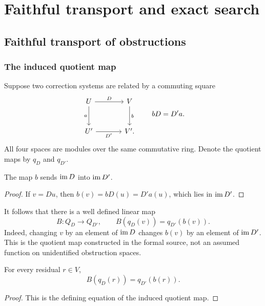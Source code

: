 \chapter{Faithful transport and exact search}\label{CR:book:chapter-56}
\section{Faithful transport of obstructions}\label{CR:cr-source-section-4}\label{CR:ch:transport}
\subsection{The induced quotient map}
Suppose two correction systems are related by a commuting square
\begin{equation}\label{CR:eq:square}
\begin{tikzcd}[column sep=large,row sep=large]
U \arrow[r,"D"] \arrow[d,"a"'] & V \arrow[d,"b"]\\
U' \arrow[r,"D'"'] & V'.
\end{tikzcd}
\qquad bD=D'a.
\end{equation}
All four spaces are modules over the same commutative ring. Denote the quotient maps by $q_D$ and $q_{D'}$.

\begin{CRlemma}\label{CR:lem:range-maps}
The map $b$ sends $\operatorname{im} D$ into $\operatorname{im} D'$.
\end{CRlemma}
\begin{proof}
If $v=Du$, then $b(v)=bD(u)=D'a(u)$, which lies in $\operatorname{im} D'$.
\end{proof}

It follows that there is a well defined linear map
\[
B:Q_D\longrightarrow Q_{D'},\qquad B(q_D(v))=q_{D'}(b(v)).
\]
Indeed, changing $v$ by an element of $\operatorname{im} D$ changes $b(v)$ by an element of $\operatorname{im} D'$. This is the quotient map constructed in the formal source, not an assumed function on unidentified obstruction spaces.

\begin{CRproposition}[Naturality]\label{CR:prop:naturality}
For every residual $r\in V$,
\begin{equation}\label{CR:eq:naturality}
B(q_D(r))=q_{D'}(b(r)).
\end{equation}
\end{CRproposition}
\begin{proof}
This is the defining equation of the induced quotient map.
\end{proof}

